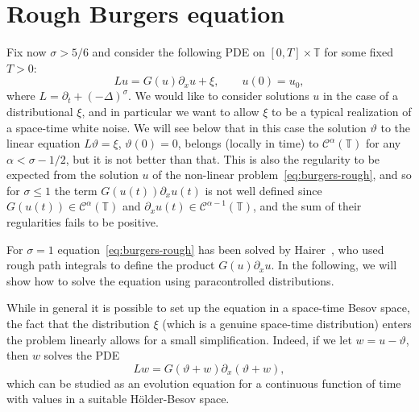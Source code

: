 \documentclass[a4paper,11pt]{article}
\theoremstyle{remark}
\newcommand{\CC}{\ensuremath{\mathscr{C}}}
\begin{document}
\section{Rough Burgers equation}\label{sec:burgers}

Fix now $\sigma > 5/6$ and consider the following PDE on $[ 0,T ] \times \mathbb{T}$ for some fixed $T>0$:
\begin{equation}\label{eq:burgers-rough}
  L u=G ( u ) \partial_{x} u+ \xi, \qquad u(0) = u_0,
\end{equation}
where $L= \partial_{t} + ( - \Delta )^{\sigma}$. We would like to consider solutions $u$ in the case of a
distributional $\xi$, and in particular we want to allow $\xi$ to be a typical
realization of a space-time white noise. We will see below that in this case
the solution $\vartheta$ to the linear equation $L  \vartheta = \xi$,
$\vartheta ( 0 ) =0$, belongs (locally in time) to $\CC^{\alpha} ( \mathbb{T})$ for any $\alpha < \sigma -1/2$, but it is not better than that. This is
also the regularity to be expected from the solution $u$ of the non-linear
problem~{\eqref{eq:burgers-rough}}, and so for $\sigma \leqslant 1$ the term $G ( u ( t ) ) \partial_{x} u ( t )$ is not well defined since $G ( u ( t ) ) \in \CC^{\alpha} ( \mathbb{T} )$ and $\partial_{x} u ( t ) \in \CC^{\alpha -1} (\mathbb{T} )$, and the sum of their regularities fails to be positive.

For $\sigma =1$ equation~\eqref{eq:burgers-rough} has been solved by
Hairer~{\cite{Hairer2011}}, who used rough path integrals to define the
product $G ( u ) \partial_{x} u$. In the following, we will show how to solve
the equation using paracontrolled distributions.



While in general it is possible to set up the equation in a space-time Besov
space, the fact that the distribution $\xi$ (which is a genuine space-time
distribution) enters the problem linearly allows for a small simplification.
Indeed, if we let $w=u- \vartheta$, then $w$ solves the PDE
\begin{equation}\label{eq:burgers-alt}
  L w=G ( \vartheta +w ) \partial_{x} ( \vartheta +w ),
\end{equation}
which can be studied as an evolution equation for a continuous function of
time with values in a suitable H{\"o}lder-Besov space.
\end{document}
